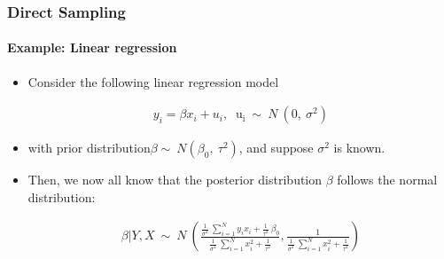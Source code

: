 \documentclass[
  shownotes,
  xcolor={svgnames},
  hyperref={colorlinks,citecolor=DarkBlue,linkcolor=DarkRed,urlcolor=DarkBlue}
  , aspectratio=169]{beamer}
\begin{document}
\begin{frame}[fragile]
\frametitle{Direct Sampling}
\framesubtitle{Example: Linear regression}

\begin{itemize}
\item Consider the following linear regression model

\begin{align}
    y_{i} = \beta x_{i} + u_{i},\ \text{\ \ u}_{\text{i\ }}\sim\ N\ (0,\ \sigma^{2})
\end{align}


\item with prior distribution$\beta\sim\ N\left( \beta_{0},\ \tau^{2} \right)$, and suppose $\sigma^{2}$ is known.

\item Then, we now all know that the posterior distribution $\beta$ follows the normal distribution:

\begin{align}
\beta|Y,X\ \sim\ N\ (\frac{\frac{1}{\sigma^{2}}\ \sum_{i = 1}^{N}{y_{i}x_{i} + \frac{1}{\tau^{2}}\ \beta_{0}}}{\frac{1}{\sigma^{2}}\ \sum_{i = 1}^{N}{x_{i}^{2} + \frac{1}{\tau^{2}}}} ,\frac{1}{\frac{1}{\sigma^{2}}\ \sum_{i = 1}^{N}{x_{i}^{2} + \frac{1}{\tau^{2}}}})
\end{align}

\end{itemize}
\end{frame}
\end{document}
